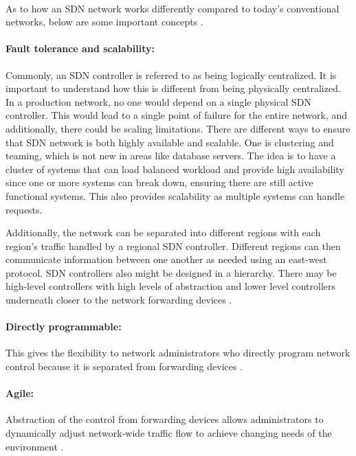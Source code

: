 \paragraph{}
As to how an SDN network works differently compared to today's conventional networks, below are some important concepts \cite{sdn-def}.

\paragraph{Fault tolerance and scalability:}
Commonly, an SDN controller is referred to as being logically centralized. It is important to understand how this is different from being physically centralized. In a production network, no one would depend on a single physical SDN controller. This would lead to a single point of failure for the entire network, and additionally, there could be scaling limitations. There are different ways to ensure that SDN network is both highly available and scalable. One is clustering and teaming, which is not new in areas like database servers. The idea is to have a cluster of systems that can load balanced workload and provide high availability since one or more systems can break down, ensuring there are still active functional systems. This also provides scalability as multiple systems can handle requests. 

Additionally, the network can be separated into different regions with each region's traffic handled by a regional SDN controller. Different regions can then communicate information between one another as needed using an east-west protocol. SDN controllers also might be designed in a hierarchy. There may be high-level controllers with high levels of abstraction and lower level controllers underneath closer to the network forwarding devices \cite{6994333}.

\paragraph{Directly programmable:} This gives the flexibility to network administrators who directly program network control because it is separated from forwarding devices \cite{sdn-def}.

\paragraph{Agile:} Abstraction of the control from forwarding devices allows administrators to dynamically adjust network-wide traffic flow to achieve changing needs of the environment \cite{sdn-def}.

